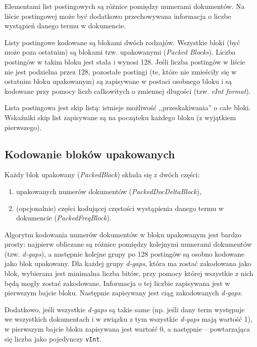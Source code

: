 Elementami list postingowych są różnice pomiędzy numerami dokumentów. Na liście postingowej może być dodatkowo przechowywana informacja o liczbe wystąpień danego termu w dokumencie.

Listy postingowe kodowane są blokami dwóch rodzajów. Wszystkie bloki (być może poza ostatnim) są blokami tzw. upakowanymi (\emph{Packed Blocks}). Liczba postingów w takim bloku jest stała i wynosi 128. Jeśli liczba postingów w liście nie jest podzielna przez 128, pozostałe postingi (te, które nie zmieściły się w ostatnim bloku upakowanym) są zapisywane w postaci osobnego bloku i są kodowane przy pomocy liczb całkowitych o zmiennej długości (tzw. \emph{vInt format}).

Lista postingowa jest skip listą: istnieje możliwość ,,przeskakiwania'' o całe bloki. Wskaźniki skip list zapisywane są na począteku każdego bloku (z wyjątkiem pierwszego).

\subsection{Kodowanie bloków upakowanych}

Każdy blok upakowany (\emph{PackedBlock}) składa się z dwóch części: 
\begin{enumerate}
 \item upakowanych numerów dokumentów (\emph{PackedDocDeltaBlock}),
 \item (opcjonalnie) części kodującej częstości wystąpienia danego termu w dokumencie (\emph{PackedFreqBlock}).
\end{enumerate}

Algorytm kodowania numerów dokumentów w bloku upakowanym jest bardzo prosty: najpierw obliczane są różnice pomiędzy kolejnymi numerami dokumentów (tzw. \emph{d-gaps}), a następnie kolejne grupy po 128 postingów są osobno kodowane jako blok upakowany. Dla każdej grupy \emph{d-gaps}, która ma zostać zakodowana jako blok, wybierana jest minimalna liczba bitów, przy pomocy której wszystkie z nich będą mogły zostać zakodowane. Informacja o tej liczbie zapisywana jest w pierwszym bajcie bloku. Następnie zapisywany jest ciąg zakodowanych \emph{d-gaps}.

Dodatkowo, jeśli wszystkie \emph{d-gaps} są takie same (np. jeśli dany term występuje we wszystkich dokumentach i w związku z tym wszystkie \emph{d-gaps} mają wartość 1), w pierwszym bajcie bloku zapisywana jest wartość 0, a następnie -- powtarzająca się liczba jako pojedynczy \texttt{vInt}.

